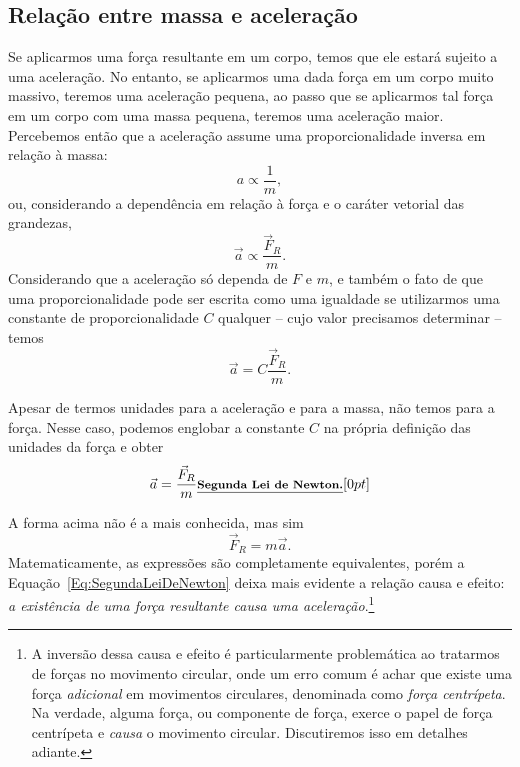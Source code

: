 \subsection{Relação entre massa e aceleração}

Se aplicarmos uma força resultante em um corpo, temos que ele estará sujeito a uma aceleração. No entanto, se aplicarmos uma dada força em um corpo muito massivo, teremos uma aceleração pequena, ao passo que se aplicarmos tal força em um corpo com uma massa pequena, teremos uma aceleração maior. Percebemos então que a aceleração assume uma proporcionalidade inversa em relação à massa:
\begin{equation}
  a \propto \frac{1}{m},
\end{equation}
%
ou, considerando a dependência em relação à força e o caráter vetorial das grandezas,
\begin{equation}
  \vec{a} \propto \frac{\vec{F}_R}{m}.
\end{equation}
%
Considerando que a aceleração só dependa de $F$ e $m$, e também o fato de que uma proporcionalidade pode ser escrita como uma igualdade se utilizarmos uma constante de proporcionalidade $C$ qualquer -- cujo valor precisamos determinar -- temos
\begin{equation}
  \vec{a} = C \frac{\vec{F}_R}{m}.
\end{equation}

Apesar de termos unidades para a aceleração e para a massa, não temos para a força. Nesse caso, podemos englobar a constante $C$ na própria definição das unidades da força e obter
\begin{equation}\label{Eq:SegundaLeiDeNewton}
  \vec{a} = \frac{\vec{F}_R}{m} \relax{\footnotesize\emph{\textbf{Segunda Lei de Newton.}}}[0pt]
\end{equation}

A forma acima não é a mais conhecida, mas sim 
\begin{equation}
  \vec{F}_R = m \vec{a}.
\end{equation}
%
Matematicamente, as expressões são completamente equivalentes, porém a Equação~\ref{Eq:SegundaLeiDeNewton} deixa mais evidente a relação causa e efeito: \emph{a existência de uma força resultante causa uma aceleração}.\footnote{A inversão dessa causa e efeito é particularmente problemática ao tratarmos de forças no movimento circular, onde um erro comum é achar que existe uma força \emph{adicional} em movimentos circulares, denominada como \emph{força centrípeta}. Na verdade, alguma força, ou componente de força, exerce o papel de força centrípeta e \emph{causa} o movimento circular. Discutiremos isso em detalhes adiante.}


